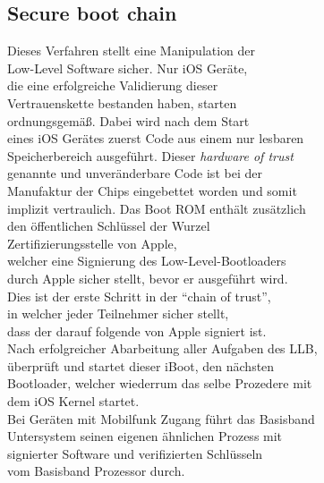 	\subsection{Secure boot chain}
		Dieses Verfahren stellt eine Manipulation der \\
		Low-Level Software sicher. Nur iOS Geräte, \\
		die eine erfolgreiche Validierung dieser\\ 
		Vertrauenskette bestanden haben, starten\\ 
		ordnungsgemäß. Dabei wird nach dem Start\\
		eines iOS Gerätes zuerst Code aus einem nur lesbaren\\
		Speicherbereich ausgeführt. Dieser \textit{hardware of trust}\\ 
		genannte und unveränderbare Code ist bei der\\
		Manufaktur der Chips eingebettet worden und somit\\
		implizit vertraulich. Das Boot ROM enthält zusätzlich\\
		den öffentlichen Schlüssel der Wurzel\\ 
		Zertifizierungsstelle von Apple,\\
		welcher eine Signierung des Low-Level-Bootloaders\\
		durch Apple sicher stellt, bevor er ausgeführt wird.\\ 
		Dies ist der erste Schritt in der "`chain of trust"',\\ 
		in welcher jeder Teilnehmer sicher stellt,\\ 
		dass der darauf	folgende von Apple signiert	ist.\\
		Nach erfolgreicher Abarbeitung aller Aufgaben des LLB,\\
		überprüft und startet dieser iBoot, den nächsten\\
		Bootloader, welcher wiederrum das selbe Prozedere mit\\
		dem iOS Kernel startet.\\
		Bei Geräten mit Mobilfunk Zugang führt das Basisband\\
		Untersystem seinen eigenen ähnlichen Prozess mit\\
		signierter Software und verifizierten Schlüsseln\\
		vom Basisband Prozessor durch.\\
		
	    
